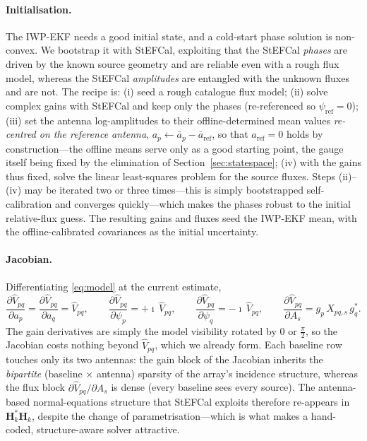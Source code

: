 \documentclass[11pt]{article}
\begin{document}
\paragraph{Initialisation.} The IWP-EKF needs a good initial state, and a cold-start phase solution
is non-convex. We bootstrap it with StEFCal, exploiting that the StEFCal \emph{phases} are driven by
the known source geometry and are reliable even with a rough flux model, whereas the StEFCal
\emph{amplitudes} are entangled with the unknown fluxes and are not. The recipe is: (i) seed a rough
catalogue flux model; (ii) solve complex gains with StEFCal and keep only the phases (re-referenced
so $\psi_{\mathrm{ref}}=0$); (iii) set the antenna log-amplitudes to their offline-determined mean
values \emph{re-centred on the reference antenna}, $a_p \leftarrow \bar a_p - \bar a_{\mathrm{ref}}$,
so that $a_{\mathrm{ref}}=0$ holds by construction---the offline means serve only as a good starting
point, the gauge itself being fixed by the elimination of Section~\ref{sec:statespace}; (iv) with the gains thus fixed, solve the linear
least-squares problem for the source fluxes. Steps (ii)--(iv) may be iterated two or
three times---this is simply bootstrapped self-calibration and converges quickly---which makes the
phases robust to the initial relative-flux guess. The resulting gains and fluxes seed the IWP-EKF
mean, with the offline-calibrated covariances as the initial uncertainty.

\paragraph{Jacobian.} Differentiating \eqref{eq:model} at the current estimate,
\begin{equation}
  \frac{\partial \hat V_{pq}}{\partial a_p}=\frac{\partial \hat V_{pq}}{\partial a_q}=\hat V_{pq},
  \qquad
  \frac{\partial \hat V_{pq}}{\partial \psi_p}=+\imath\,\hat V_{pq},
  \qquad
  \frac{\partial \hat V_{pq}}{\partial \psi_q}=-\imath\,\hat V_{pq},
  \qquad
  \frac{\partial \hat V_{pq}}{\partial A_s}=g_p\,X_{pq,s}\,g_q^{\ast}.
  \label{eq:jac}
\end{equation}
The gain derivatives are simply the model visibility rotated by $0$ or $\tfrac{\pi}{2}$, so the
Jacobian costs nothing beyond $\hat V_{pq}$, which we already form. Each baseline row touches
only its two antennas: the gain block of the Jacobian inherits the \emph{bipartite}
(baseline$\,\times\,$antenna) sparsity of the array's incidence structure, whereas the flux
block $\partial\hat V_{pq}/\partial A_s$ is dense (every baseline sees every source). The
antenna-based normal-equations structure that StEFCal exploits therefore re-appears in
$\bm{H}_k^{\ast}\bm{H}_k$, despite the change of parametrisation---which is what makes a
hand-coded, structure-aware solver attractive.
\end{document}
